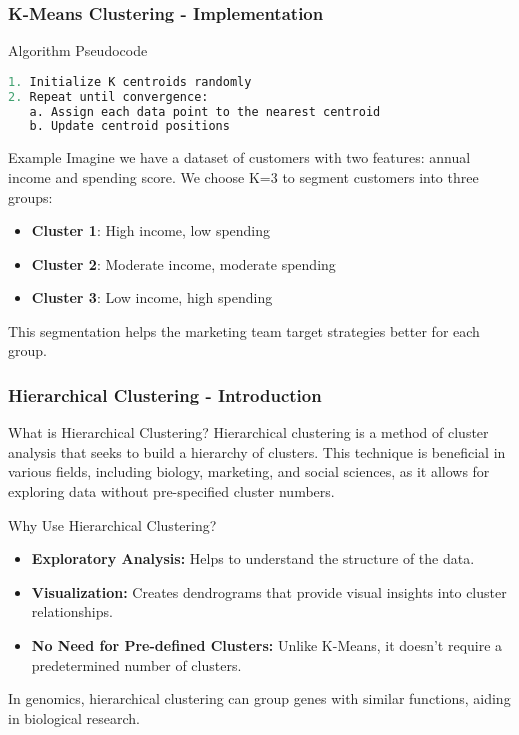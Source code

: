 \documentclass[aspectratio=169]{beamer}
\begin{document}
\begin{frame}[fragile]
    \frametitle{K-Means Clustering - Implementation}
    \begin{block}{Algorithm Pseudocode}
        \begin{lstlisting}[language=python]
1. Initialize K centroids randomly
2. Repeat until convergence:
   a. Assign each data point to the nearest centroid
   b. Update centroid positions
        \end{lstlisting}
    \end{block}

    \begin{block}{Example}
        Imagine we have a dataset of customers with two features: annual income and spending score. We choose K=3 to segment customers into three groups:
        \begin{itemize}
            \item \textbf{Cluster 1}: High income, low spending
            \item \textbf{Cluster 2}: Moderate income, moderate spending
            \item \textbf{Cluster 3}: Low income, high spending
        \end{itemize}
        This segmentation helps the marketing team target strategies better for each group.
    \end{block}
\end{frame}

\begin{frame}[fragile]
    \frametitle{Hierarchical Clustering - Introduction}
    \begin{block}{What is Hierarchical Clustering?}
        Hierarchical clustering is a method of cluster analysis that seeks to build a hierarchy of clusters. This technique is beneficial in various fields, including biology, marketing, and social sciences, as it allows for exploring data without pre-specified cluster numbers.
    \end{block}

    \begin{block}{Why Use Hierarchical Clustering?}
        \begin{itemize}
            \item \textbf{Exploratory Analysis:} Helps to understand the structure of the data.
            \item \textbf{Visualization:} Creates dendrograms that provide visual insights into cluster relationships.
            \item \textbf{No Need for Pre-defined Clusters:} Unlike K-Means, it doesn’t require a predetermined number of clusters.
        \end{itemize}
    \end{block}
    
    \begin{example}
        In genomics, hierarchical clustering can group genes with similar functions, aiding in biological research.
    \end{example}
\end{frame}
\end{document}
